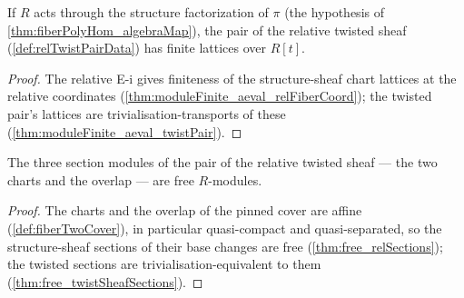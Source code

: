 \begin{theorem}
  \label{thm:moduleFinite_aeval_relTwistPair}
  \leanok
  If \(R\) acts through the structure factorization of \(\pi\) (the hypothesis of
  \ref{thm:fiberPolyHom_algebraMap}), the pair of the relative twisted sheaf
  (\ref{def:relTwistPairData}) has finite lattices over \(R[t]\).
\end{theorem}
\begin{proof}
  \leanok
  The relative E-i gives finiteness of the structure-sheaf chart lattices at the
  relative coordinates (\ref{thm:moduleFinite_aeval_relFiberCoord}); the twisted pair's
  lattices are trivialisation-transports of these
  (\ref{thm:moduleFinite_aeval_twistPair}).
\end{proof}

\begin{theorem}
  \label{thm:free_relTwistSections}
  \leanok
  The three section modules of the pair of the relative twisted sheaf --- the two
  charts and the overlap --- are free \(R\)-modules.
\end{theorem}
\begin{proof}
  \leanok
  The charts and the overlap of the pinned cover are affine
  (\ref{def:fiberTwoCover}), in particular quasi-compact and quasi-separated, so the
  structure-sheaf sections of their base changes are free
  (\ref{thm:free_relSections}); the twisted sections are trivialisation-equivalent to
  them (\ref{thm:free_twistSheafSections}).
\end{proof}

